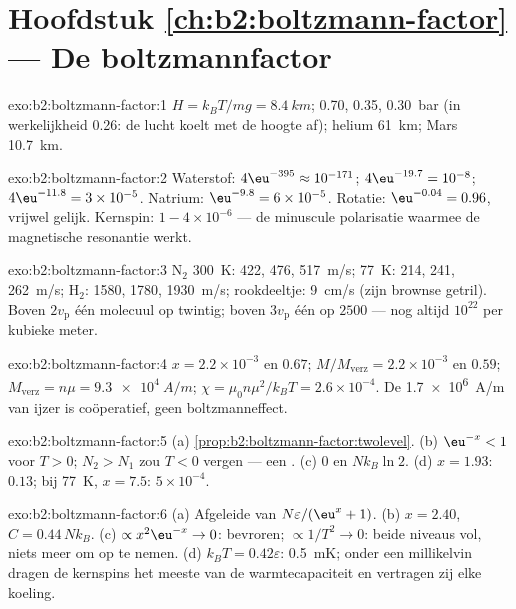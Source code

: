 \section*{Hoofdstuk \ref{ch:b2:boltzmann-factor} --- De boltzmannfactor}

\begin{solution}{exo:b2:boltzmann-factor:1}
$H = k_BT/mg = \qty{8.4}{km}$; \qty{0.70}{}, \qty{0.35}{}, \qty{0.30}{bar}
(in werkelijkheid
\qty{0.26}{}: de lucht koelt met de hoogte af); helium \qty{61}{km}; Mars
\qty{10.7}{km}.
\end{solution}

\begin{solution}{exo:b2:boltzmann-factor:2}
Waterstof: $4\eu^{-395} \approx 10^{-171}$; $4\eu^{-19.7} = 10^{-8}$;
$4\eu^{-11.8} = 3 \times
10^{-5}$. Natrium: $\eu^{-9.8} = 6 \times 10^{-5}$.
Rotatie: $\eu^{-0.04} = 0.96$, vrijwel
gelijk. Kernspin: $1 - 4 \times 10^{-6}$ --- de minuscule polarisatie waarmee
de magnetische resonantie werkt.
\end{solution}

\begin{solution}{exo:b2:boltzmann-factor:3}
N$_2$ \qty{300}{K}: \qty{422}{}, \qty{476}{}, \qty{517}{m/s}; \qty{77}{K}:
\qty{214}{}, \qty{241}{},
\qty{262}{m/s}; H$_2$: \qty{1580}{}, \qty{1780}{}, \qty{1930}{m/s}; rookdeeltje:
\qty{9}{cm/s} (zijn brownse getril). Boven $2v_{\text{p}}$ één molecuul op
twintig; boven $3v_{\text{p}}$ één op $2500$ --- nog altijd $10^{22}$ per
kubieke meter.
\end{solution}

\begin{solution}{exo:b2:boltzmann-factor:4}
$x = 2.2 \times 10^{-3}$ en $0.67$; $M/M_{\text{verz}} = 2.2 \times 10^{-3}$
en $0.59$;
$M_{\text{verz}} = n\mu = \qty{9.3e4}{A/m}$;
$\chi = \mu_0n\mu^2/k_BT = 2.6 \times 10^{-4}$.
De \qty{1.7e6}{A/m} van ijzer is coöperatief, geen boltzmanneffect.
\end{solution}

\begin{solution}{exo:b2:boltzmann-factor:5}
(a) \cref{prop:b2:boltzmann-factor:twolevel}. (b) $\eu^{-x} < 1$ voor $T > 0$;
$N_2 > N_1$ zou $T < 0$ vergen --- een . (c) $0$ en
$Nk_B\ln 2$. (d) $x = 1.93$: $0.13$; bij \qty{77}{K}, $x = 7.5$: $5 \times 10^{-4}$.
\end{solution}

\begin{solution}{exo:b2:boltzmann-factor:6}
(a) Afgeleide van $N\varepsilon/(\eu^x + 1)$. (b) $x = 2.40$, $C = 0.44\,Nk_B$.
(c) $\propto x^2\eu^{-x} \to 0$: bevroren; $\propto 1/T^2 \to 0$: beide niveaus vol,
niets meer om op te nemen. (d) $k_BT = 0.42\varepsilon$: \qty{0.5}{mK}; onder een
millikelvin dragen de kernspins het meeste van de warmtecapaciteit en
vertragen zij elke koeling.
\end{solution}

